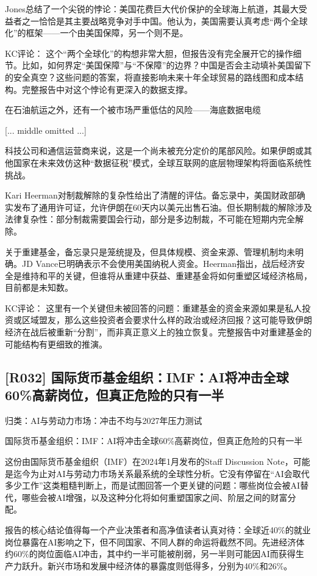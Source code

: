 \documentclass[11pt]{ctexart}
\begin{document}
Jones总结了一个尖锐的悖论：美国花费巨大代价保护的全球海上航道，其最大受益者之一恰恰是其主要战略竞争对手中国。他认为，美国需要认真考虑“两个全球化”的框架——一个由美国保障，另一个则不是。

KC评论： 这个“两个全球化”的构想非常大胆，但报告没有完全展开它的操作细节。比如，如何界定“美国保障”与“不保障”的边界？中国是否会主动填补美国留下的安全真空？这些问题的答案，将直接影响未来十年全球贸易的路线图和成本结构。完整报告中对这个悖论有更深入的数据支撑。

在石油航运之外，还有一个被市场严重低估的风险——海底数据电缆

[... middle omitted ...]

科技公司和通信运营商来说，这是一个尚未被充分定价的尾部风险。如果伊朗或其他国家在未来效仿这种“数据征税”模式，全球互联网的底层物理架构将面临系统性挑战。

Kari Heerman对制裁解除的复杂性给出了清醒的评估。备忘录中，美国财政部确实发布了通用许可证，允许伊朗在60天内以美元出售石油。但长期制裁的解除涉及法律复杂性：部分制裁需要国会行动，部分是多边制裁，不可能在短期内完全解除。

关于重建基金，备忘录只是笼统提及，但具体规模、资金来源、管理机制均未明确。JD Vance已明确表示不会使用美国纳税人资金。Heerman指出，战后经济安全是维持和平的关键，但谁将从重建中获益、重建基金将如何重塑区域经济格局，目前都是未知数。

KC评论： 这里有一个关键但未被回答的问题：重建基金的资金来源如果是私人投资或区域盟友，那么这些投资者会要求什么样的政治或经济回报？这可能导致伊朗经济在战后被重新“分割”，而非真正意义上的独立恢复。完整报告中对重建基金的可能结构有更细致的推演。

\subsection{[R032] 国际货币基金组织：IMF：AI将冲击全球60\%高薪岗位，但真正危险的只有一半}
{\small\color{refgray}归类：AI与劳动力市场：冲击不均与2027年压力测试}

国际货币基金组织：IMF：AI将冲击全球60\%高薪岗位，但真正危险的只有一半

这份由国际货币基金组织（IMF）在2024年1月发布的Staff Discussion Note，可能是迄今为止对AI与劳动力市场关系最系统的全球性分析。它没有停留在“AI会取代多少工作”这类粗糙判断上，而是试图回答一个更关键的问题：哪些岗位会被AI替代，哪些会被AI增强，以及这种分化将如何重塑国家之间、阶层之间的财富分配。

报告的核心结论值得每一个产业决策者和高净值读者认真对待：全球近40\%的就业岗位暴露在AI影响之下，但不同国家、不同人群的命运将截然不同。先进经济体约60\%的岗位面临AI冲击，其中约一半可能被削弱，另一半则可能因AI而获得生产力跃升。新兴市场和发展中经济体的暴露度则低得多，分别为40\%和26\%。
\end{document}
